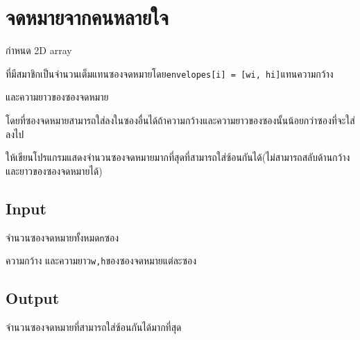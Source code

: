 \documentclass{article}
\begin{document}
\section*{จดหมายจากคนหลายใจ}

กำหนด 2D array

ที่มีสมาชิกเป็นจำนวนเต็มแทนซองจดหมายโดย\texttt{envelopes{[}i{]}\ =\ {[}wi,\ hi{]}}แทนความกว้าง

และความยาวของซองจดหมาย



โดยที่ซองจดหมายสามารถใส่ลงในซองอื่นได้ถ้าความกว้างและความยาวของซองนั้นน้อยกว่าซองที่จะใส่ลงไป



ให้เขียนโปรแกรมแสดงจำนวนซองจดหมายมากที่สุดที่สามารถใส่ซ้อนกันได้(ไม่สามารถสลับด้านกว้างและยาวของซองจดหมายได้)



\subsection*{Input}
จำนวนซองจดหมายทั้งหมด\texttt{n}ซอง



ความกว้าง และความยาว\texttt{w,h}ของซองจดหมายแต่ละซอง



\subsection*{Output}
จำนวนซองจดหมายที่สามารถใส่ซ้อนกันได้มากที่สุด
\end{document}
